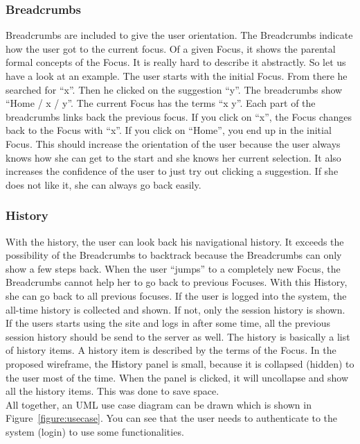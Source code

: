 \documentclass[11pt]{report}
\begin{document}
\subsubsection{Breadcrumbs}

Breadcrumbs are included to give the user orientation. The Breadcrumbs indicate how the user got to the current focus. Of a given Focus, it shows the parental formal concepts of the Focus. It is really hard to describe it abstractly. So let us have a look at an example. The user starts with the initial Focus. From there he searched for ``x''. Then he clicked on the suggestion ``y''. The breadcrumbs show ``Home / x / y''. The current Focus has the terms ``x y''. Each part of the breadcrumbs links back the previous focus. If you click on ``x'', the Focus changes back to the Focus with ``x''. If you click on ``Home'', you end up in the initial Focus. This should increase the orientation of the user because the user always knows how she can get to the start and she knows her current selection. It also increases the confidence of the user to just try out clicking a suggestion. If she does not like it, she can always go back easily. 

\subsubsection{History}

With the history, the user can look back his navigational history. It exceeds the possibility of the Breadcrumbs to backtrack because the Breadcrumbs can only show a few steps back. When the user ``jumps'' to a completely new Focus, the Breadcrumbs cannot help her to go back to previous Focuses. With this History, she can go back to all previous focuses. If the user is logged into the system, the all-time history is collected and shown. If not, only the session history is shown. If the users starts using the site and logs in after some time, all the previous session history should be send to the server as well. The history is basically a list of history items. A history item is described by the terms of the Focus. In the proposed wireframe, the History panel is small, because it is collapsed (hidden) to the user most of the time. When the panel is clicked, it will uncollapse and show all the history items. This was done to save space.\\

All together, an UML use case diagram can be drawn which is shown in Figure~\ref{figure:usecase}. You can see that the user needs to authenticate to the system (login) to use some functionalities.
\end{document}
